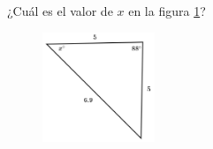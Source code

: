 ¿Cuál es el valor de $x$ en la figura \ref{fig:findangle12}?
\begin{figure}[H]
    \begin{center}
        \includegraphics[width=0.3\textwidth]{../images/findangle12.png}
    \end{center}
    \caption{}
    \label{fig:findangle12}
\end{figure}